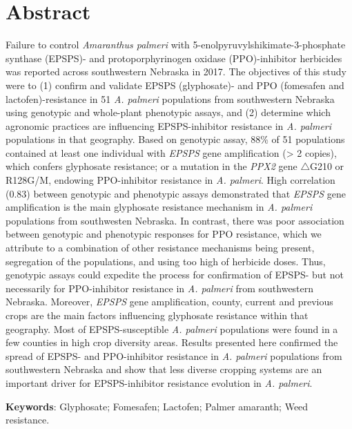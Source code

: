 \documentclass[10pt,letterpaper]{article}
\begin{document}
\section*{Abstract}
Failure to control \emph{Amaranthus palmeri} with
5-enolpyruvylshikimate-3-phosphate synthase (EPSPS)- and
protoporphyrinogen oxidase (PPO)-inhibitor herbicides was reported
across southwestern Nebraska in 2017. The objectives of this study were
to (1) confirm and validate EPSPS (glyphosate)- and PPO (fomesafen and
lactofen)-resistance in 51 \emph{A. palmeri} populations from
southwestern Nebraska using genotypic and whole-plant phenotypic assays,
and (2) determine which agronomic practices are influencing
EPSPS-inhibitor resistance in \emph{A. palmeri} populations in that
geography. Based on genotypic assay, 88\% of 51 populations contained at
least one individual with \emph{EPSPS} gene amplification
(\textgreater{} 2 copies), which confers glyphosate resistance; or a
mutation in the \emph{PPX2} gene \(\triangle\)G210 or R128G/M, endowing
PPO-inhibitor resistance in \emph{A. palmeri}. High correlation (0.83)
between genotypic and phenotypic assays demonstrated that \emph{EPSPS}
gene amplification is the main glyphosate resistance mechanism in
\emph{A. palmeri} populations from southwesten Nebraska. In contrast,
there was poor association between genotypic and phenotypic responses
for PPO resistance, which we attribute to a combination of other
resistance mechanisms being present, segregation of the populations, and
using too high of herbicide doses. Thus, genotypic assays could expedite
the process for confirmation of EPSPS- but not necessarily for
PPO-inhibitor resistance in \emph{A. palmeri} from southwestern
Nebraska. Moreover, \emph{EPSPS} gene amplification, county, current and
previous crops are the main factors influencing glyphosate resistance
within that geography. Most of EPSPS-susceptible \emph{A. palmeri}
populations were found in a few counties in high crop diversity areas.
Results presented here confirmed the spread of EPSPS- and PPO-inhibitor
resistance in \emph{A. palmeri} populations from southwestern Nebraska
and show that less diverse cropping systems are an important driver for
EPSPS-inhibitor resistance evolution in \emph{A. palmeri}.


\linenumbers

\noindent \textbf{Keywords}: Glyphosate; Fomesafen; Lactofen; Palmer
amaranth; Weed resistance.
\end{document}
